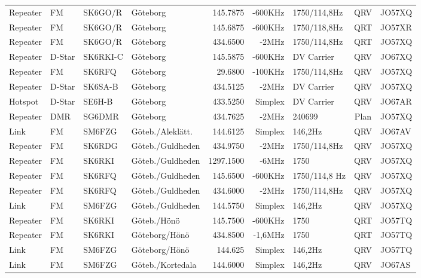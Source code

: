 \begin{longtable}{llllrrlcl}
Repeater & FM     & SK6GO/R  & Göteborg            & 145.7875  & -600KHz & 1750/114,8Hz    & QRV  & JO57XQ \\
Repeater & FM     & SK6GO/R  & Göteborg            & 145.6875  & -600KHz & 1750/118,8Hz    & QRT  & JO57XR \\
Repeater & FM     & SK6GO/R  & Göteborg            & 434.6500  & -2MHz   & 1750/114,8Hz    & QRT  & JO57XQ \\
Repeater & D-Star & SK6RKI-C & Göteborg            & 145.5875  & -600KHz & DV Carrier      & QRV  & JO67XQ \\
Repeater & FM     & SK6RFQ   & Göteborg            & 29.6800   & -100KHz & 1750/114,8Hz    & QRV  & JO57XQ \\
Repeater & D-Star & SK6SA-B  & Göteborg            & 434.5125  & -2MHz   & DV Carrier      & QRV  & JO57XQ \\
Hotspot  & D-Star & SE6H-B   & Göteborg            & 433.5250  & Simplex & DV Carrier      & QRV  & JO67AR \\
Repeater & DMR    & SG6DMR   & Göteborg            & 434.7625  & -2MHz   & 240699          & Plan & JO57XQ \\
Link     & FM     & SM6FZG   & Göteb./Aleklätt.    & 144.6125  & Simplex & 146,2Hz         & QRV  & JO67AV \\
Repeater & FM     & SK6RDG   & Göteb./Guldheden    & 434.9750  & -2MHz   & 1750/114,8Hz    & QRV  & JO57XQ \\
Repeater & FM     & SK6RKI   & Göteb./Guldheden    & 1297.1500 & -6MHz   & 1750            & QRV  & JO57XQ \\
Repeater & FM     & SK6RFQ   & Göteb./Guldheden    & 145.6500  & -600KHz & 1750/114,8 Hz   & QRV  & JO57XQ \\
Repeater & FM     & SK6RFQ   & Göteb./Guldheden    & 434.6000  & -2MHz   & 1750/114,8Hz    & QRV  & JO57XQ \\
Link     & FM     & SM6FZG   & Göteb./Guldheden    & 144.5750  & Simplex & 146,2Hz         & QRV  & JO57XQ \\
Repeater & FM     & SK6RKI   & Göteb./Hönö         & 145.7500  & -600KHz & 1750            & QRT  & JO57TQ \\
Repeater & FM     & SK6RKI   & Göteborg/Hönö       & 434.8500  & -1,6MHz & 1750            & QRT  & JO57TQ \\
Link     & FM     & SM6FZG   & Göteborg/Hönö       & 144.625   & Simplex & 146,2Hz         & QRV  & JO57TQ \\
Link     & FM     & SM6FZG   & Göteb./Kortedala    & 144.6000  & Simplex & 146,2Hz         & QRV  & JO67AS \\

\end{longtable}
